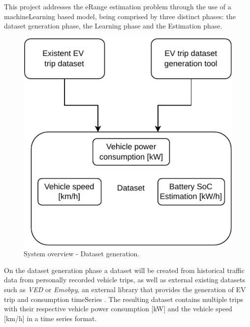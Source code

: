 This project addresses the \gls{eRange} estimation
problem through the use of a \gls{machineLearning}
based model, being comprised by three distinct phases: 
the \gls{dataset} generation phase, the Learning phase
and the Estimation phase.

\begin{figure}[H]
    \begin{center}
        \includegraphics[scale=1.0]{../figures/generic_diagram_dataset_generation_phase}
        \caption{System overview - Dataset generation.}
        \label{fig:generic_diagram_dataset_generation_phase}
    \end{center}
\end{figure}

On the \gls{dataset} generation phase
a dataset will be created from historical traffic data
from personally recorded vehicle trips, as well as
external existing datasets such as \textit{VED} 
\citep{vedDataset} or \textit{Emobpy}, an external 
library that provides the generation of \gls{EV} 
trip and consumption \gls{timeSeries} \citep{emobpy}.
The resulting dataset contains multiple
trips with their respective vehicle power consumption [kW]
and the vehicle speed [km/h] in a time series format.

